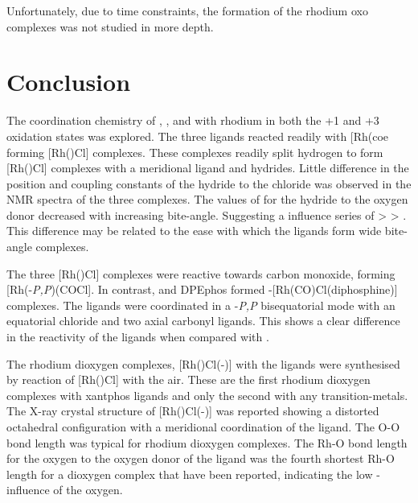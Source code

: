 Unfortunately, due to time constraints, the formation of the rhodium oxo complexes was not studied in more depth.  

\section{Conclusion}

The coordination chemistry of \tBusixantphos{}, \tButhixantphos{}, and \tBuxantphos{} with rhodium in both the +1 and +3 oxidation states was explored.  The three ligands reacted readily with [Rh(coe\ce{)2Cl]2} forming [Rh(\tBuxantphosk)Cl] complexes.  These complexes readily split hydrogen to form  [Rh(\tBuxantphosk)Cl] complexes with a meridional \tBuxantphos{} ligand and \cis{} hydrides.  Little difference in the position and coupling constants of the hydride \trans{} to the chloride was observed in the \proton{} NMR spectra of the three complexes.  The values of \JRhH{} for the hydride \trans{} to the oxygen donor decreased with increasing bite-angle.  Suggesting a \trans{} influence series of \tBuxantphos{} \textgreater{} \tButhixantphos{} \textgreater{} \tBusixantphos{}.  This difference may be related to the ease with which the ligands form wide bite-angle complexes.

The three [Rh(\tBuxantphosk)Cl] complexes were reactive towards carbon monoxide, forming [Rh(\tBuxantphos\dento{}-\emph{P,P}\textprime{})(COCl]. In contrast, \Phxantphos{} and DPEphos{} formed \trans-[Rh(CO)Cl(diphosphine)] complexes.  The \tBuxantphos{} ligands were coordinated in a \dento{}-\emph{P,P}\textprime{} bisequatorial mode with an equatorial chloride and two axial carbonyl ligands.  This shows a clear difference in the reactivity of the \tBuxantphos{} ligands when compared with \Phxantphos.

The rhodium dioxygen complexes, [Rh(\tBuxantphos)Cl(-)] with the \tBuxantphos{} ligands were synthesised by reaction of  [Rh(\tBuxantphosk)Cl] with the air.  These are the first rhodium dioxygen complexes with xantphos ligands and only the second with any transition-metals.  The X-ray crystal structure of [Rh(\tBuxantphos)Cl(-)] was reported showing a distorted octahedral configuration with a meridional coordination of the \tBuxantphos{} ligand.  The O-O bond length was typical for rhodium dioxygen complexes.  The Rh-O bond length for the oxygen \trans{} to the oxygen donor of the \tBuxantphos{} ligand was the fourth shortest Rh-O length for a dioxygen complex that have been reported, indicating the low \trans-influence of the \tBuxantphos{} oxygen.  

